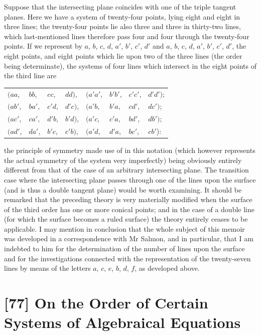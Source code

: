 \documentclass[11pt,a4paper]{book}
\begin{document}
Suppose that the intersecting plane coincides with one of the triple tangent planes. Here we have a system of twenty-four points, lying eight and eight in three lines; the twenty-four points lie also three and three in thirty-two lines, which last-mentioned lines therefore pass four and four through the twenty-four points. If we represent by $a$, $b$, $c$, $d$, $a'$, $b'$, $c'$, $d'$ and $a$, $b$, $c$, $d$, $a'$, $b'$, $c'$, $d'$, the eight points, and eight points which lie upon two of the three lines (the order being determinate), the systems of four lines which intersect in the eight points of the third line are
\begin{center}
\begin{tabular}{llllllll}
$(aa$, & $bb$, & $cc$, & $dd)$, & $(a'a'$, & $b'b'$, & $c'c'$, & $d'd')$; \\
$(ab'$, & $ba'$, & $c'd$, & $d'c)$, & $(a'b$, & $b'a$, & $cd'$, & $dc')$; \\
$(ac'$, & $ca'$, & $d'b$, & $b'd)$, & $(a'c$, & $c'a$, & $bd'$, & $db')$; \\
$(ad'$, & $da'$, & $b'c$, & $c'b)$, & $(a'd$, & $d'a$, & $bc'$, & $cb'$):
\end{tabular}
\end{center}
the principle of symmetry made use of in this notation (which however represents the actual symmetry of the system very imperfectly) being obviously entirely different from that of the case of an arbitrary intersecting plane. The transition case where the intersecting plane passes through one of the lines upon the surface (and is thus a double tangent plane) would be worth examining. It should be remarked that the preceding theory is very materially modified when the surface of the third order has one or more conical points; and in the case of a double line (for which the surface becomes a ruled surface) the theory entirely ceases to be applicable. I may mention in conclusion that the whole subject of this memoir was developed in a correspondence with Mr Salmon, and in particular, that I am indebted to him for the determination of the number of lines upon the surface and for the investigations connected with the representation of the twenty-seven lines by means of the letters $a$, $c$, $e$, $b$, $d$, $f$, as developed above.


\newpage
\section*{[77] On the Order of Certain Systems of Algebraical Equations}
\end{document}
